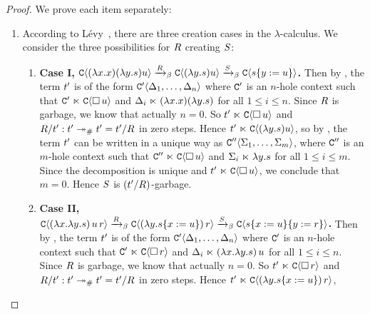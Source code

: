 \begin{proof}
We prove each item separately:
\begin{enumerate}
\item
  According to L\'evy~\cite{Tesis:Levy:1978},
  there are three creation cases in the $\lambda$-calculus.
  We consider the three possibilities for $R$ creating $S$:
  \begin{enumerate}
  \item
    {\bf Case I,
      $
         \mathtt{C}\langle(\lambda x. x)(\lambda y. s)u\rangle
       \mathrel{\xrightarrow{R}_\beta}
         \mathtt{C}\langle(\lambda y. s)u\rangle
       \mathrel{\xrightarrow{S}_\beta}
         \mathtt{C}\langle s\{y := u\}\rangle
      $.}
    Then by ,
    the term $t'$ is of the form
    $\mathtt{C}'\langle\Delta_1,\hdots,\Delta_n\rangle$
    where $\mathtt{C}'$ is an $n$-hole context such that $\mathtt{C}' \mathrel{\ltimes} \mathtt{C}\langle\Box\,u\rangle$
    and $\Delta_i \mathrel{\ltimes} (\lambda x. x)(\lambda y. s)$ for all $1 \leq i \leq n$.
    Since $R$ is garbage, we know that actually $n = 0$.
    So $t' \mathrel{\ltimes} \mathtt{C}\langle\Box\,u\rangle$ and $R/t' : t' \mathrel{\twoheadrightarrow_{\mathtt{\#}}} t' = t'/R$ in zero steps.
    Hence $t' \mathrel{\ltimes} \mathtt{C}\langle(\lambda y. s)u\rangle$,
    so by ,
    the term $t'$ can be written in a unique way as
    $\mathtt{C}''\langle\Sigma_1,\hdots,\Sigma_m\rangle$, where $\mathtt{C}''$ is an $m$-hole context
    such that $\mathtt{C}'' \mathrel{\ltimes} \mathtt{C}\langle\Box\,u\rangle$ and $\Sigma_i \mathrel{\ltimes} \lambda y. s$ for all $1 \leq i \leq m$.
    Since the decomposition is unique and $t' \mathrel{\ltimes} \mathtt{C}\langle\Box\,u\rangle$,
    we conclude that $m = 0$.
    Hence $S$ is $(t'/R)$-garbage.
  \item
    {\bf Case II,
      $
         \mathtt{C}\langle(\lambda x. \lambda y. s)\,u\,r\rangle
       \mathrel{\xrightarrow{R}_\beta}
         \mathtt{C}\langle(\lambda y. s\{x := u\})\,r\rangle
       \mathrel{\xrightarrow{S}_\beta}
         \mathtt{C}\langle s\{x := u\}\{y := r\}\rangle
      $.}
    Then by ,
    the term $t'$ is of the form
    $\mathtt{C}'\langle\Delta_1,\hdots,\Delta_n\rangle$
    where $\mathtt{C}'$ is an $n$-hole context such that $\mathtt{C}' \mathrel{\ltimes} \mathtt{C}\langle\Box\,r\rangle$
    and $\Delta_i \mathrel{\ltimes} (\lambda x. \lambda y. s)\,u$ for all $1 \leq i \leq n$.
    Since $R$ is garbage, we know that actually $n = 0$.
    So $t' \mathrel{\ltimes} \mathtt{C}\langle\Box\,r\rangle$ and $R/t' : t' \mathrel{\twoheadrightarrow_{\mathtt{\#}}} t' = t'/R$
    in zero steps. Hence $t' \mathrel{\ltimes} \mathtt{C}\langle(\lambda y. s\{x := u\})\,r\rangle$,

\end{enumerate}
\end{enumerate}
\end{proof}
